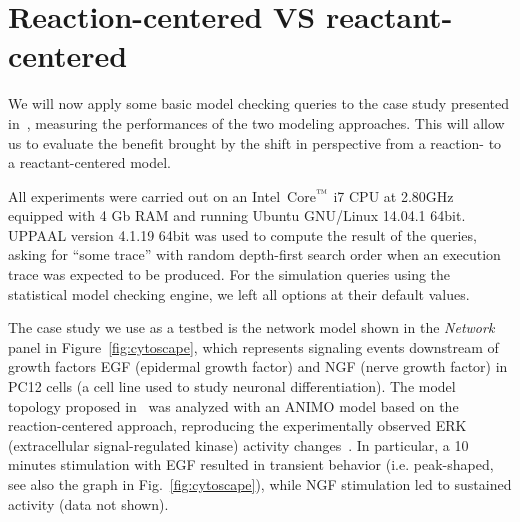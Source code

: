 \documentclass{llncs}
\newcommand{\tas}{Timed Automata}
\begin{document}


\section{Reaction-centered VS reactant-centered}\label{sec:animo-comparison}
We will now apply some basic model checking queries to the case study presented in~\cite{animo-ieee},
measuring the performances of the two modeling approaches. This will allow us to
evaluate the benefit brought by the shift in perspective from a reaction- to a reactant-centered model.

All experiments were carried out on an Intel\circledR\ Core$^{\mbox{\scriptsize\texttrademark}}$ i7 CPU at 2.80GHz equipped with 4 Gb RAM
and running Ubuntu GNU/Linux 14.04.1 64bit.
UPPAAL version 4.1.19 64bit was used to compute the result of the queries, asking for ``some trace'' with random depth-first search order
when an execution trace was expected to be produced. For the simulation queries using the statistical model checking engine, we left
all options at their default values.

The case study we use as a testbed is the network model shown in the \emph{Network} panel in Figure~\ref{fig:cytoscape},
which represents signaling events downstream of growth factors EGF (epidermal growth factor)
and NGF (nerve growth factor) in PC12 cells (a cell line used to study neuronal differentiation).
The model topology proposed in~\cite{egf-ngf} was analyzed
with an ANIMO model based on the reaction-centered approach, reproducing the experimentally 
observed ERK (extracellular signal-regulated kinase) activity changes~\cite{animo-ieee}.
In particular, a 10 minutes stimulation with EGF resulted in transient behavior (i.e. peak-shaped,
see also the graph in Fig.~\ref{fig:cytoscape}), while NGF stimulation led to sustained activity (data not shown).%
\end{document}
